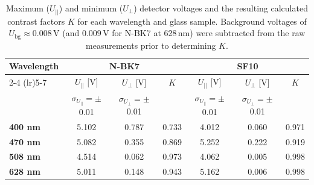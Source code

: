 \documentclass[a4paper]{article}
\renewcommand{\arraystretch}{0.9}
\begin{document}
\begin{table}[H]
  \centering
  \renewcommand{\arraystretch}{1.2}
  \setlength{\tabcolsep}{6pt}
  \begin{tabular}{l c c c c c c}
    \toprule
    \multirow{2}{*}{\textbf{Wavelength}} & \multicolumn{3}{c}{\textbf{N-BK7}} & \multicolumn{3}{c}{\textbf{SF10}} \\
    \cmidrule(lr){2-4} \cmidrule(lr){5-7}
    & $U_{||}$ [V] & $U_{\perp}$ [V] & $K$ & $U_{||}$ [V] & $U_{\perp}$ [V] & $K$ \\
    & $\sigma_{U_{||}}=\pm$ 0.01 & $\sigma_{U_{\perp}}=\pm$ 0.01 & & $\sigma_{U_{||}}=\pm$ 0.01 & $\sigma_{U_{\perp}}=\pm$ 0.01 & \\
    \midrule
    \textbf{400 nm} & 5.102 & 0.787 & 0.733 & 4.012 & 0.060 & 0.971 \\
    \textbf{470 nm} & 5.082 & 0.355 & 0.869 & 5.252 & 0.222 & 0.919 \\
    \textbf{508 nm} & 4.514 & 0.062 & 0.973 & 4.062 & 0.005 & 0.998 \\
    \textbf{628 nm} & 5.011 & 0.148 & 0.943 & 5.162 & 0.006 & 0.998 \\
    \bottomrule
  \end{tabular}
  \caption{Maximum ($U_{||}$) and minimum ($U_{\perp}$) detector voltages and the resulting calculated contrast factors $K$ for each wavelength and glass sample. Background voltages of $U_{\mathrm{bg}} \approx 0.008$\,V (and $0.009$\,V for N-BK7 at 628\,nm) were subtracted from the raw measurements prior to determining $K$.}\label{tab:contrast_data}
\end{table}
\end{document}
